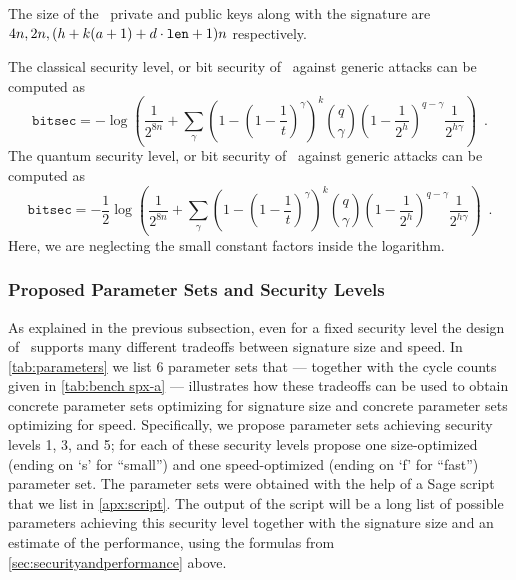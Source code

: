 
The size of the \SPHINCSA\ private and public keys along with the signature are $4n,2n,(h + k(a + 1) + d \cdot {\tt len} + 1)n$ respectively.

The classical security level, or bit security of \SPHINCSA\ against generic attacks can be computed as
$$
\mathtt{bitsec} = -\log\left(
    \frac{1}{2^{8n}}+
    \sum_{\gamma}
        \left(1-\left(1-\frac{1}{t}\right)^{\gamma}\right)^{k}
        \binom{q}{\gamma}
        \left(1-\frac{1}{2^{h}}\right)^{q-\gamma}
        \frac{1}{2^{h\gamma}}
    \right) \enspace.
$$
The quantum security level, or bit security of \SPHINCSA\ against generic attacks can be computed as
$$
\mathtt{bitsec} = -\frac{1}{2}\log\left(
    \frac{1}{2^{8n}}+
    \sum_{\gamma}
        \left(1-\left(1-\frac{1}{t}\right)^{\gamma}\right)^{k}
        \binom{q}{\gamma}
        \left(1-\frac{1}{2^{h}}\right)^{q-\gamma}
        \frac{1}{2^{h\gamma}}
    \right) \enspace.
$$
Here, we are neglecting the small constant factors inside the logarithm. 



\subsubsection{Proposed Parameter Sets and Security Levels}

As explained in the previous subsection, even for a fixed security level the design of \SPHINCSA\ supports many different tradeoffs between signature size and speed. In \cref{tab:parameters} we list 6 parameter sets that --- together with the cycle counts given in \cref{tab:bench spx-a} --- illustrates how these tradeoffs can be used to obtain concrete parameter sets optimizing for signature size and concrete parameter sets optimizing for speed. Specifically, we propose parameter sets achieving security levels 1, 3, and 5; for each of these security levels propose one size-optimized (ending on `s' for ``small'') and one speed-optimized (ending on `f' for ``fast'') parameter set. The parameter sets were obtained with the help of a Sage script that we list in \cref{apx:script}.  The output of the script will be a long list of possible parameters achieving this security level together with the signature size and an estimate of the performance, using the formulas from \cref{sec:securityandperformance} above.


